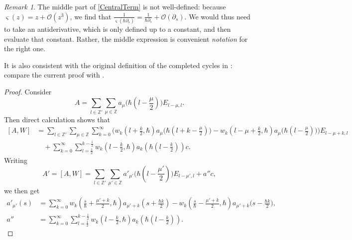 \documentclass[10pt,a4paper,oneside,no-math,reqno]{amsart}%
\theoremstyle{plain}
\theoremstyle{definition}
\theoremstyle{remark}
\newtheorem{remark}[theorem]{Remark}
\numberwithin{equation}{section}
\newcommand{\mb}[1]{\mathbb{#1}}
\newcommand{\mc}[1]{\mathcal{#1}}
\newcommand{\1}{\mathds{1}}
\newcommand{\Z}{\mb{Z}}
\newcommand{\<}{\langle}
\renewcommand{\>}{\rangle}
\newcommand{\del}{\partial}
\begin{document}
\begin{remark}\label{WhatIsCentralTerm}
    The middle part of \cref{CentralTerm} is not well-defined: because $ \varsigma (z) = z + \mc{O} (z^3)$, we find that $ \frac{1}{\varsigma (\hbar \del_s)} = \frac{1}{\hbar \del_s} + \mc{O} (\del_s)$. We would thus need to take an antiderivative, which is only defined up to a constant, and then evaluate that constant. Rather, the middle expression is convenient \emph{notation} for the right one.\par
    It is also consistent with the original definition of the completed cycles in \cite{OP06a}: compare the current proof with \cite[Section 0.4.3]{OP06a}.
\end{remark}

\begin{proof}
	Consider
	\begin{equation}
	A = \sum_{l \in \Z'} \sum_{\mu \in \Z} a_\mu \big( \hbar (l -\frac{\mu}{2})\big) E_{l-\mu,l}.
	\end{equation} 
	Then direct calculation shows that
	\begin{equation}
        \begin{split}
		      [A,W]
		      &=
		      \sum_{l \in \Z'} \sum_{\mu \in \Z} \sum_{k=0}^\infty \Big( w_k (l + \frac{k}{2}, \hbar ) a_\mu \big( \hbar ( l + k - \frac{\mu}{2} ) \big) - w_k ( l - \mu + \frac{k}{2}, \hbar ) a_\mu \big( \hbar( l - \frac{\mu}{2} ) \big) \Big) E_{l - \mu + k,l}
            \\
            &\quad + \sum_{k=0}^\infty \sum_{ l = \frac{1}{2}}^{k - \frac{1}{2}} w_k (l - \frac{k}{2}, \hbar ) a_k ( \hbar ( l - \frac{k}{2})) c.
        \end{split}
	\end{equation}
	Writing
	\begin{equation} 
		A' 
		=
		[A,W]
		=
		\sum_{l \in \Z'} \sum_{\mu' \in \Z} a'_{\mu'} \big( \hbar ( l -\frac{\mu'}{2}) \big) E_{l - \mu',l} + a'' c,
	\end{equation} 
	we then get
	\begin{align}
		a'_{\mu'} ( s)
		&=
		\sum_{k=0}^\infty w_k (\frac{s}{\hbar} + \frac{\mu' +k}{2}, \hbar ) a_{\mu'+k} ( s + \frac{\hbar k}{2}) - w_k ( \frac{s}{\hbar} - \frac{\mu'+k}{2}, \hbar ) a_{\mu'+k} \big( s - \frac{\hbar k}{2}\big) ,
        \\
        a'' 
        &=
        \sum_{k=0}^\infty \sum_{ l = \frac{1}{2}}^{k - \frac{1}{2}} w_k (l - \frac{k}{2}, \hbar ) a_k ( \hbar ( l - \frac{k}{2})).
	\end{align}

\end{proof}
\end{document}
